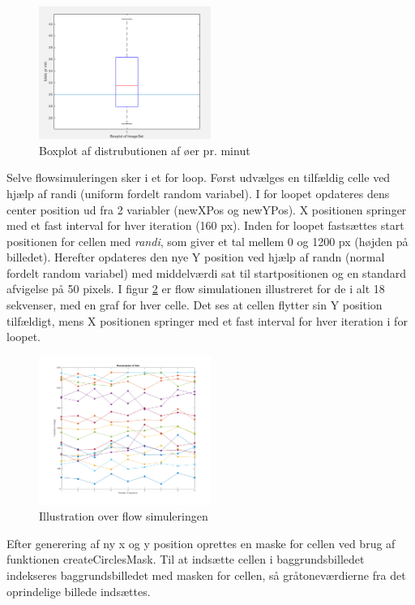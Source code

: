  \begin{figure}[H]
	\centering
	\includegraphics[width=0.5\textwidth]{billeder/software/boxplot.png}
	\caption{Boxplot af distrubutionen af øer pr. minut}
	\label{fig:boxplot}
\end{figure}

Selve flowsimuleringen sker i et for loop. Først udvælges en tilfældig celle ved hjælp af randi (uniform fordelt random variabel). I for loopet opdateres dens center position ud fra 2 variabler (newXPos og newYPos). X positionen springer med et fast interval for hver iteration (160 px). Inden for loopet fastsættes start positionen for cellen med \textit{randi}, som giver et tal mellem 0 og 1200 px (højden på billedet). Herefter opdateres den nye Y position ved hjælp af randn (normal fordelt random variabel) med middelværdi sat til startpositionen og en standard afvigelse på 50 pixels. I figur \ref{fig:flowsim} er flow simulationen illustreret for de i alt 18 sekvenser, med en graf for hver celle. Det ses at cellen flytter sin Y position tilfældigt, mens X positionen springer med et fast interval for hver iteration i for loopet.

\begin{figure}[H]
	\centering
	\includegraphics[width=0.5\textwidth]{billeder/software/Simulation.png}
	\caption{Illustration over flow simuleringen}
	\label{fig:flowsim}
\end{figure}

Efter generering af ny x og y position oprettes en maske for cellen ved brug af funktionen createCirclesMask. Til at indsætte cellen i baggrundsbilledet indekseres baggrundsbilledet med masken for cellen, så gråtoneværdierne fra det oprindelige billede indsættes.

